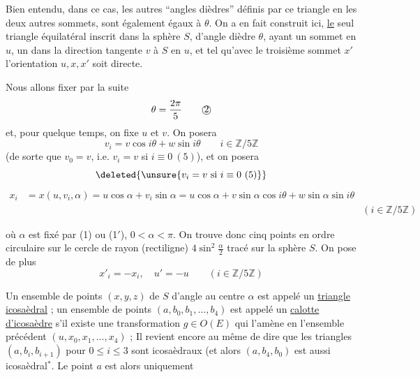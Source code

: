 Bien entendu, dans ce cas, les autres ``angles dièdres'' définis par ce triangle en les deux autres sommets, sont également égaux à $\theta$. On a en fait construit ici,  \uline{le} seul triangle équilatéral inscrit dans la sphère $S$, d'angle dièdre $\theta$, ayant un sommet en $u$, un   dans la direction tangente $v$ à $S$ en $u$, et  tel qu'avec le troisième sommet $x'$ l'orientation $u,x,x'$ soit directe.

Nous allons fixer par la suite
\[
\theta=\frac{2\pi}{5}\tag*{\textcircled{2}}
\]
et, pour quelque temps, on fixe $u$ et $v$. On posera
\[
v_i=v\cos i\theta+w\sin i\theta\qquad i\in\mathbb Z/5\mathbb Z\tag*{(3)}
\]
(de sorte que $v_0=v$, i.e. $v_i=v$ si $i\equiv0\ (5)$), et on posera
\[
\deleted{\unsure{v_i=v\ \text{si }i\equiv0\ (5)}}
\]
\[
\begin{aligned}
x_i&=x(u,v_i,\alpha)=u\cos\alpha+v_i\sin\alpha
=u\cos\alpha+v\sin\alpha\cos i\theta+w\sin\alpha\sin i\theta\\
&& (i\in\mathbb Z/5\mathbb Z)
\end{aligned}\tag*{(4)}
\]

où $\alpha$ est fixé par (1) ou (1$'$), $0<\alpha<\pi$. On trouve donc cinq points en ordre circulaire sur le cercle de  rayon (rectiligne) $4\sin^2\frac{\alpha}{2}$ tracé sur la sphère $S$. On pose de plus
\[
x'_i=-x_i,\quad u'=-u\qquad (i\in\mathbb Z/5\mathbb Z)\tag*{(5)}
\]

Un ensemble de points $(x,y,z)$ de $S$  d'angle au centre $\alpha$ est appelé un \uline{triangle icosaèdral} ;  un ensemble de points $(a,b_0,b_1,\ldots,b_4)$  est appelé un \uline{calotte d'icosaèdre} s'il existe une transformation  $g\in O(E)$ qui l'amène en l'ensemble précédent $(u,x_0,x_1,\ldots,x_4)$ ; Il revient encore au même  de dire  que les triangles $(a,b_i,b_{i+1})$ pour $0\leq i\leq3$ sont icosaèdraux (et alors $(a,b_4,b_0)$ est aussi icosaèdral$^{*}$. Le point $a$ est alors uniquement

